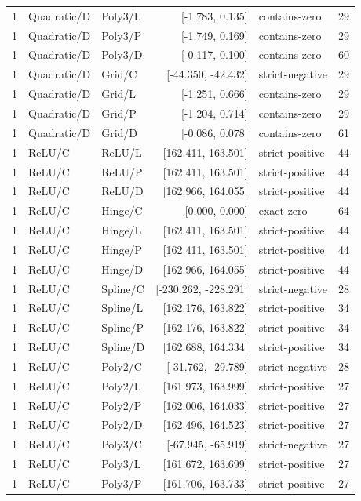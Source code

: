\begin{longtable}{lllrlr}
1 & Quadratic/D & Poly3/L & [-1.783, 0.135] & contains-zero & 29 \\
1 & Quadratic/D & Poly3/P & [-1.749, 0.169] & contains-zero & 29 \\
1 & Quadratic/D & Poly3/D & [-0.117, 0.100] & contains-zero & 60 \\
1 & Quadratic/D & Grid/C & [-44.350, -42.432] & strict-negative & 29 \\
1 & Quadratic/D & Grid/L & [-1.251, 0.666] & contains-zero & 29 \\
1 & Quadratic/D & Grid/P & [-1.204, 0.714] & contains-zero & 29 \\
1 & Quadratic/D & Grid/D & [-0.086, 0.078] & contains-zero & 61 \\
1 & ReLU/C & ReLU/L & [162.411, 163.501] & strict-positive & 44 \\
1 & ReLU/C & ReLU/P & [162.411, 163.501] & strict-positive & 44 \\
1 & ReLU/C & ReLU/D & [162.966, 164.055] & strict-positive & 44 \\
1 & ReLU/C & Hinge/C & [0.000, 0.000] & exact-zero & 64 \\
1 & ReLU/C & Hinge/L & [162.411, 163.501] & strict-positive & 44 \\
1 & ReLU/C & Hinge/P & [162.411, 163.501] & strict-positive & 44 \\
1 & ReLU/C & Hinge/D & [162.966, 164.055] & strict-positive & 44 \\
1 & ReLU/C & Spline/C & [-230.262, -228.291] & strict-negative & 28 \\
1 & ReLU/C & Spline/L & [162.176, 163.822] & strict-positive & 34 \\
1 & ReLU/C & Spline/P & [162.176, 163.822] & strict-positive & 34 \\
1 & ReLU/C & Spline/D & [162.688, 164.334] & strict-positive & 34 \\
1 & ReLU/C & Poly2/C & [-31.762, -29.789] & strict-negative & 28 \\
1 & ReLU/C & Poly2/L & [161.973, 163.999] & strict-positive & 27 \\
1 & ReLU/C & Poly2/P & [162.006, 164.033] & strict-positive & 27 \\
1 & ReLU/C & Poly2/D & [162.496, 164.523] & strict-positive & 27 \\
1 & ReLU/C & Poly3/C & [-67.945, -65.919] & strict-negative & 27 \\
1 & ReLU/C & Poly3/L & [161.672, 163.699] & strict-positive & 27 \\
1 & ReLU/C & Poly3/P & [161.706, 163.733] & strict-positive & 27 \\

\end{longtable}
